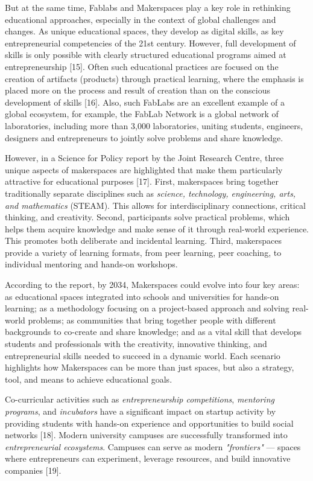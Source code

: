 But at the same time, Fablabs and Makerspaces play a key role in
rethinking educational approaches, especially in the context of global
challenges and changes. As unique educational spaces, they develop as
digital skills, as key entrepreneurial competencies of the 21st century.
However, full development of skills is only possible with clearly
structured educational programs aimed at entrepreneurship {[}15{]}.
Often such educational practices are focused on the creation of
artifacts (products) through practical learning, where the emphasis is
placed more on the process and result of creation than on the conscious
development of skills {[}16{]}. Also, such FabLabs are an excellent
example of a global ecosystem, for example, the FabLab Network is a
global network of laboratories, including more than 3,000 laboratories,
uniting students, engineers, designers and entrepreneurs to jointly
solve problems and share knowledge.

However, in a Science for Policy report by the Joint Research Centre,
three unique aspects of makerspaces are highlighted that make them
particularly attractive for educational purposes {[}17{]}. First,
makerspaces bring together traditionally separate disciplines such as
\emph{science, technology, engineering, arts, and mathematics} (STEAM).
This allows for interdisciplinary connections, critical thinking, and
creativity. Second, participants solve practical problems, which helps
them acquire knowledge and make sense of it through real-world
experience. This promotes both deliberate and incidental learning.
Third, makerspaces provide a variety of learning formats, from peer
learning, peer coaching, to individual mentoring and hands-on workshops.

According to the report, by 2034, Makerspaces could evolve into four key
areas: as educational spaces integrated into schools and universities
for hands-on learning; as a methodology focusing on a project-based
approach and solving real-world problems; as communities that bring
together people with different backgrounds to co-create and share
knowledge; and as a vital skill that develops students and professionals
with the creativity, innovative thinking, and entrepreneurial skills
needed to succeed in a dynamic world. Each scenario highlights how
Makerspaces can be more than just spaces, but also a strategy, tool, and
means to achieve educational goals.

Co-curricular activities such as \emph{entrepreneurship competitions},
\emph{mentoring programs}, and \emph{incubators} have a significant
impact on startup activity by providing students with hands-on
experience and opportunities to build social networks {[}18{]}. Modern
university campuses are successfully transformed into
\emph{entrepreneurial ecosystems}. Campuses can serve as modern
\emph{"frontiers"} --- spaces where entrepreneurs can experiment,
leverage resources, and build innovative companies {[}19{]}.

